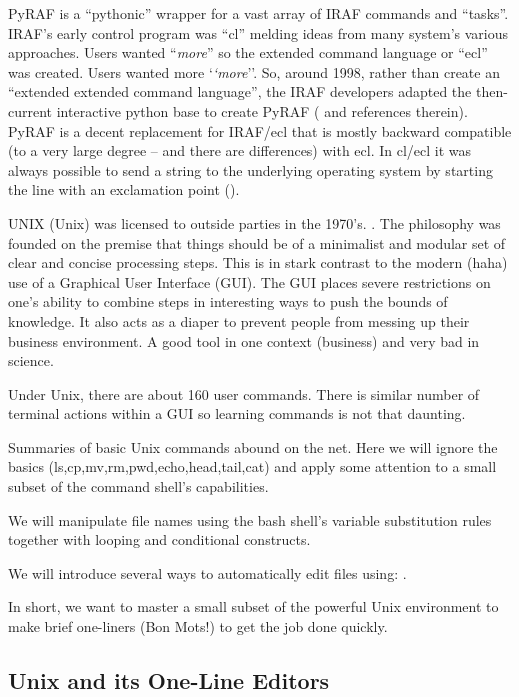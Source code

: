 \documentclass[letter,11pt,oneside]{article}
\begin{document}
PyRAF is a ``pythonic'' wrapper for a vast array of IRAF commands and
``tasks''.  IRAF's early control program was ``cl'' melding ideas from
many system's various approaches.   Users
wanted ``\emph{more}'' so the extended command language or ``ecl'' was
created. Users wanted more `\emph{`more}''.  So, around 1998, rather
than create an ``extended extended command language'', the
 IRAF developers adapted the then-current
interactive python base to create PyRAF (\cite{2006hstc.conf..437G}
and references therein). PyRAF is a decent replacement for IRAF/ecl
that is mostly backward compatible (to a very large degree -- and
there are differences) with ecl. In cl/ecl it was always possible to
send a string to the underlying operating system by starting the line
with an exclamation point ({\color{verbcolor}{\verb#!#}}).

UNIX\texttrademark\; (Unix) was licensed to outside parties in the 1970's.
. The philosophy was founded on the premise that things
should be of a minimalist and modular set of clear and concise processing
steps. This is in stark contrast to the modern (haha) use of a Graphical
User Interface (GUI). The GUI places severe restrictions on one's ability
to combine steps in interesting ways to push the bounds of knowledge. It
also acts as a diaper to prevent people from messing up their business
environment. A good tool in one context (business) and very bad in science.

Under Unix, there are about 160 user commands. There is similar number
of terminal actions within a GUI so learning commands is not that daunting.

Summaries of basic Unix commands abound on the net. Here we will
ignore the basics (ls,cp,mv,rm,pwd,echo,head,tail,cat) and apply
some attention to a small subset of the {\color{verbcolor}{\verb#bash#}}
command shell's capabilities. 

We will manipulate file names using the bash shell's variable
substitution rules together with looping and conditional constructs.

We will introduce several ways to automatically edit files using:
{\color{verbcolor}{\verb#sed,awk and vi#}}. 

In short, we want to master a small subset of the powerful Unix environment
to make brief one-liners (Bon Mots!) to get the job done quickly.

\subsection{Unix and its One-Line Editors}
\end{document}
